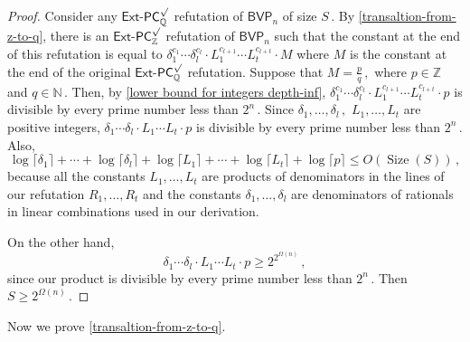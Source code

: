 \documentclass[11pt]{article}
\newcommand{\Q}{{\mathbb Q}}
\newcommand{\Z}{{\mathbb Z}}
\DeclareMathOperator{\Size}{\mathrm{Size}}
\begin{document}
\begin{proof}
Consider any $\mathsf{Ext}$-$\mathsf{PC}^{\surd}_{\Q}$ refutation of $\mathsf{BVP}_n$ of size %
$S\,.$ %
 By \autoref{transaltion-from-z-to-q}, there is an $\mathsf{Ext}$-$\mathsf{PC}^{\surd}_{\Z}$ refutation of $\mathsf{BVP}_n$ such that the constant at %
the end of this refutation is equal to $\delta_1^{c_{1}} \cdots \delta_l^{c_{l}} \cdot  L_1^{c_{l + 1}} \cdots L_t^{c_{l + t}}  \cdot M$ where $M$ is the constant at %
the end of the original $\mathsf{Ext}$-$\mathsf{PC}^{\surd}_{\Q}$ refutation. Suppose that %
$M = \frac{p}{q}\,,$ %
 where $p \in \Z$ and %
$q \in \mathbb{N}\,.$ %
 Then, by \autoref{lower bound for integers depth-inf}, $\delta_1^{c_{1}} \cdots \delta_l^{c_{l}} \cdot  L_1^{c_{l + 1}} \cdots L_t^{c_{l + t}}  \cdot p$ is divisible by every prime number less than %
$2^n\,.$ %
 Since %
$\delta_1, \ldots, \delta_l\,,$ %
 $L_1, \ldots, L_t$ are positive integers,
$
\delta_1 \cdots \delta_l \cdot  L_1 \cdots L_t  \cdot p
$
is divisible by every prime number less than %
$2^n\,.$ %
 Also,
$$
%
\log \lceil \delta_1 \rceil + \cdots + \log \lceil \delta_l \rceil + \log \lceil L_1 \rceil  + \cdots +  \log \lceil L_t \rceil + \log \lceil p \rceil \le O(\Size(S))\,, %
$$ 
because all the constants $L_1, \ldots, L_t$ are products of denominators in the lines of our refutation %
$R_1, \ldots, R_t$ %
 and the constants $\delta_1, \ldots, \delta_l$ are denominators of rationals in linear combinations used in our derivation.

On the other hand,  
$$
%
\delta_1 \cdots \delta_l \cdot  L_1 \cdots L_t  \cdot p \ge 2^{2^{\Omega(n)}}\,, %
$$
since our product is divisible by every prime number less than %
$2^n\,.$ %
 Then %
$S \ge 2^{\Omega(n)}\,.$ %
\end{proof}

Now we prove \autoref{transaltion-from-z-to-q}. 
\end{document}
